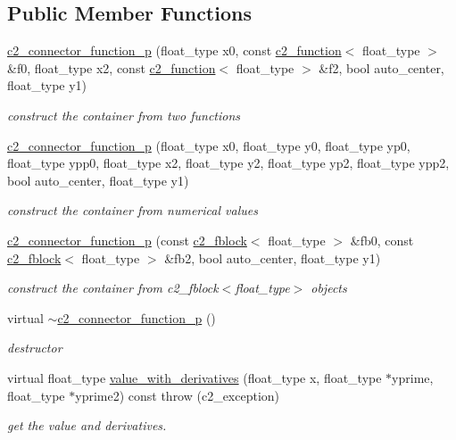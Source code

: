 \subsection*{Public Member Functions}
\begin{DoxyCompactItemize}
\item 
\hyperlink{classc2__connector__function__p_a7827c6d4a19b57d2c63ac384cb91211c}{c2\+\_\+connector\+\_\+function\+\_\+p} (float\+\_\+type x0, const \hyperlink{classc2__function}{c2\+\_\+function}$<$ float\+\_\+type $>$ \&f0, float\+\_\+type x2, const \hyperlink{classc2__function}{c2\+\_\+function}$<$ float\+\_\+type $>$ \&f2, bool auto\+\_\+center, float\+\_\+type y1)
\begin{DoxyCompactList}\small\item\em construct the container from two functions \end{DoxyCompactList}\item 
\hyperlink{classc2__connector__function__p_a2445b30d02a6a968b0c36d39feefc537}{c2\+\_\+connector\+\_\+function\+\_\+p} (float\+\_\+type x0, float\+\_\+type y0, float\+\_\+type yp0, float\+\_\+type ypp0, float\+\_\+type x2, float\+\_\+type y2, float\+\_\+type yp2, float\+\_\+type ypp2, bool auto\+\_\+center, float\+\_\+type y1)
\begin{DoxyCompactList}\small\item\em construct the container from numerical values \end{DoxyCompactList}\item 
\hyperlink{classc2__connector__function__p_a359df91e0d5560c772cea46b22d7181c}{c2\+\_\+connector\+\_\+function\+\_\+p} (const \hyperlink{classc2__fblock}{c2\+\_\+fblock}$<$ float\+\_\+type $>$ \&fb0, const \hyperlink{classc2__fblock}{c2\+\_\+fblock}$<$ float\+\_\+type $>$ \&fb2, bool auto\+\_\+center, float\+\_\+type y1)
\begin{DoxyCompactList}\small\item\em construct the container from c2\+\_\+fblock$<$float\+\_\+type$>$ objects \end{DoxyCompactList}\item 
virtual \hyperlink{classc2__connector__function__p_a3cf5737490d0653f6421cb8ea8390cbf}{$\sim$c2\+\_\+connector\+\_\+function\+\_\+p} ()
\begin{DoxyCompactList}\small\item\em destructor \end{DoxyCompactList}\item 
virtual float\+\_\+type \hyperlink{classc2__connector__function__p_a0c748860e1ef547a0cce583c01abe175}{value\+\_\+with\+\_\+derivatives} (float\+\_\+type x, float\+\_\+type $\ast$yprime, float\+\_\+type $\ast$yprime2) const   throw (c2\+\_\+exception)
\begin{DoxyCompactList}\small\item\em get the value and derivatives. \end{DoxyCompactList}\end{DoxyCompactItemize}
